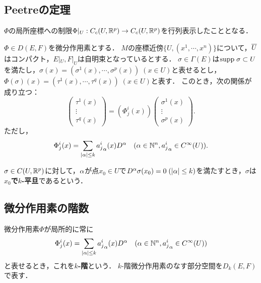 \documentclass[uplatex,dvipdfmx]{jsreport}
\begin{document}
\subsection{Peetreの定理}

\begin{tcolorbox}[colframe=ForestGreen, colback=ForestGreen!10!white,breakable,colbacktitle=ForestGreen!40!white,coltitle=black,fonttitle=\bfseries\sffamily,
title=]
    $\Phi$の局所座標への制限$\Phi|_U:C_c(U,\mathbb{R}^p)\to C_c(U,\mathbb{R}^p)$を行列表示したこととなる．
\end{tcolorbox}

\begin{theorem}[微分作用素の局所表示]
    $\Phi\in D(E,F)$を微分作用素とする．
    $M$の座標近傍$\{U,(x^1,\cdots,x^n)\}$について，$\overline{U}$はコンパクト，$E|_U,F|_U$は自明束となっているとする．
    $\sigma\in\Gamma(E)$は$\mathrm{supp}\;\sigma\subset U$を満たし，$\sigma(x)=(\sigma^1(x),\cdots,\sigma^p(x))\;(x\in U)$と表せるとし，$\Phi(\sigma)(x)=(\tau^1(x),\cdots,\tau^q(x))\;(x\in U)$と表す．
    このとき，次の関係が成り立つ：
    \[\begin{pmatrix}\tau^1(x)\\\vdots\\\tau^q(x)\end{pmatrix}=(\Phi^i_j(x))\begin{pmatrix}\sigma^1(x)\\\vdots\\\sigma^p(x)\end{pmatrix}.\]
    ただし，
    \[\Phi^i_j(x)=\sum_{\lvert\alpha\rvert\le k}{a^i_j}_\alpha(x)D^\alpha\quad(\alpha\in\mathbb{N}^n,{a^i_j}_\alpha\in C^\infty(U)).\]
\end{theorem}

\begin{definition}
    $\sigma\in C(U,\mathbb{R}^p)$に対して，$\alpha$が点$x_0\in U$で$D^\alpha\sigma(x_0)=0\;(\lvert\alpha\rvert\le k)$を満たすとき，$\sigma$は\textbf{$x_0$で$k$-平旦}であるという．
\end{definition}

\subsection{微分作用素の階数}

\begin{definition}
    微分作用素$\Phi$が局所的に常に
    \[\Phi^i_j(x)=\sum_{\lvert\alpha\rvert\le k}{a^i_j}_\alpha(x)D^\alpha\quad(\alpha\in\mathbb{N}^n,{a^i_j}_\alpha\in C^\infty(U))\]
    と表せるとき，これを\textbf{$k$-階}という．
    $k$-階微分作用素のなす部分空間を$D_k(E,F)$で表す．
\end{definition}
\end{document}
